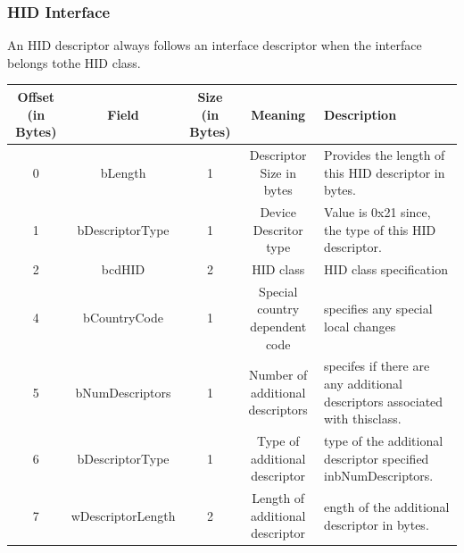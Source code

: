 \documentclass{article}
\begin{document}
\subsubsection{HID Interface}
An HID descriptor always follows an interface descriptor when the interface belongs tothe HID class.
\begin{table}[H]
    \centering
    \begin{adjustbox}{max width=\textwidth}
        \begin{tabular}{|c|c|c|c|p{6cm}|}
            \hline
            \textbf{Offset (in Bytes)} & \textbf{Field}    & \textbf{Size (in Bytes)} & \textbf{Meaning}                 & \textbf{Description}                                                        \\
            \hline
            0                          & bLength           & 1                        & Descriptor Size in bytes         & Provides the length of this  HID descriptor in bytes.                       \\
            \hline
            1                          & bDescriptorType   & 1                        & Device Descritor type            & Value is 0x21 since, the type of this HID descriptor.                       \\
            \hline
            2                          & bcdHID            & 2                        & HID class                        & HID class specification                                                     \\
            \hline
            4                          & bCountryCode      & 1                        & Special country dependent code   & specifies any special local changes                                         \\
            \hline
            5                          & bNumDescriptors   & 1                        & Number of additional descriptors & specifes if there are any additional descriptors associated with thisclass. \\
            \hline
            6                          & bDescriptorType   & 1                        & Type of additional descriptor    & type of the additional descriptor specified inbNumDescriptors.              \\
            \hline
            7                          & wDescriptorLength & 2                        & Length of additional descriptor  & ength of the additional descriptor in bytes.                                \\
            \hline
        \end{tabular}
    \end{adjustbox}
\end{table}
\end{document}
